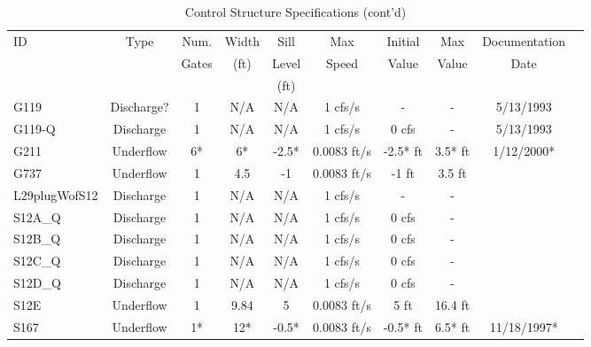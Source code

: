 \scriptsize
\begin{table}[h]
\caption{Control Structure Specifications (cont'd)}
\label{tab:struc-specs2}
\begin{tabular}{@{}lccccccccc@{}}
\toprule
{ID}            & {Type}        & Num.     & Width       & Sill         & Max            & Initial         & Max     & Documentation   \\
                &               & Gates    & (ft)        & Level        & Speed          & Value           & Value   & Date            \\
                &               &          &             & (ft)         &                &                 &         &                 \\
\hline
{G119}          & Discharge?    & 1        & N/A         & N/A          & 1 cfs/s        & -               & -       & 5/13/1993       \\
{G119-Q}        & Discharge     & 1        & N/A         & N/A          & 1 cfs/s        & 0 cfs           & -       & 5/13/1993       \\
{G211}          & Underflow     & 6*       & 6*          & -2.5*        & 0.0083 ft/s    & -2.5* ft        & 3.5* ft & 1/12/2000*      \\
{G737}          & Underflow     & 1        & 4.5         & -1           & 0.0083 ft/s    & -1 ft           & 3.5 ft  &                 \\
{L29plugWofS12} & Discharge     & 1        & N/A         & N/A          & 1 cfs/s        & -               & -       &                 \\
{S12A\_Q}       & Discharge     & 1        & N/A         & N/A          & 1 cfs/s        & 0 cfs           & -       &                 \\
{S12B\_Q}       & Discharge     & 1        & N/A         & N/A          & 1 cfs/s        & 0 cfs           & -       &                 \\
{S12C\_Q}       & Discharge     & 1        & N/A         & N/A          & 1 cfs/s        & 0 cfs           & -       &                 \\
{S12D\_Q}       & Discharge     & 1        & N/A         & N/A          & 1 cfs/s        & 0 cfs           & -       &                 \\
{S12E}          & Underflow     & 1        & 9.84        & 5            & 0.0083 ft/s    & 5 ft            & 16.4 ft &                 \\
{S167}          & Underflow     & 1*       & 12*         & -0.5*        & 0.0083 ft/s    & -0.5* ft        & 6.5* ft & 11/18/1997*     \\

\end{tabular}
\end{table}
